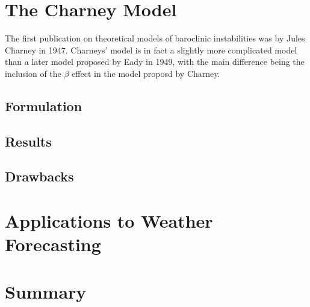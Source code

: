 \documentclass{article}
\begin{document}
\section{The Charney Model} 
The first publication on theoretical models of baroclinic instabilities was by Jules Charney in 1947. Charneys' model is in fact a slightly more complicated model than a later model proposed by Eady in 1949, with the main difference being the inclusion of the $\beta$ effect in the model proposd by Charney.  


\subsection{Formulation}
\subsection{Results}
\subsection{Drawbacks} 
\section{Applications to Weather Forecasting} 

\section{Summary}
\end{document}
